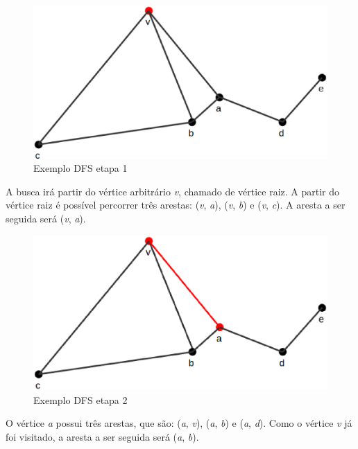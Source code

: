 \begin{figure}[!h]
	\centering
	\includegraphics[scale=0.25]{figuras/capitulo2/dfs/dfs1.eps}
	\caption{Exemplo DFS etapa 1}
	\label{dfs1}
\end{figure}

A busca irá partir do vértice arbitrário \textit{v}, chamado de vértice raiz. A partir do vértice raiz é possível percorrer três arestas: (\textit{v}, \textit{a}), (\textit{v}, \textit{b}) e (\textit{v}, \textit{c}). A aresta a ser seguida será (\textit{v}, \textit{a}).

\begin{figure}[!h]
	\centering
	\includegraphics[scale=0.25]{figuras/capitulo2/dfs/dfs2.eps}
	\caption{Exemplo DFS etapa 2}
	\label{dfs2}
\end{figure}

O vértice \textit{a} possui três arestas, que são: (\textit{a}, \textit{v}), (\textit{a}, \textit{b}) e (\textit{a}, \textit{d}). Como o vértice \textit{v} já foi visitado, a aresta a ser seguida será (\textit{a}, \textit{b}).

